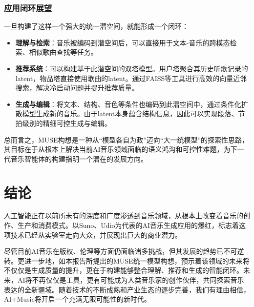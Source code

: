 \documentclass[12pt]{article}
\begin{document}
\subsubsection{应用闭环展望}
一旦构建了这样一个强大的统一潜空间，就能形成一个闭环：
\begin{itemize}
    \item \textbf{理解与检索}：音乐被编码到潜空间后，可以直接用于文本-音乐的跨模态检索、相似歌曲查找等任务。
    \item \textbf{推荐系统}：可以构建基于此潜空间的双塔模型。用户塔聚合其历史听歌记录的latent，物品塔直接使用歌曲的latent。通过FAISS等工具进行高效的向量近邻搜索，解决冷启动问题并提升推荐质量。
    \item \textbf{生成与编辑}：将文本、结构、音色等条件也编码到此潜空间中，通过条件化扩散模型生成新的音乐。由于latent本身蕴含结构信息，因此可以实现段落、节拍级别的精细可控生成与编辑。
\end{itemize}
总而言之，MUSE构想是一种从“模型各自为政”迈向“大一统模型”的探索性思路，其目标在于从根本上解决当前AI音乐领域面临的语义鸿沟和可控性难题，为下一代音乐智能体的构建指明一个潜在的发展方向。

\section{结论}

人工智能正在以前所未有的深度和广度渗透到音乐领域，从根本上改变着音乐的创作、生产和消费模式。以Suno、Udio为代表的AI音乐生成应用的爆红，标志着这项技术已经从实验室走向大众，并展现出巨大的商业潜力。

尽管目前AI音乐在版权、伦理等方面仍面临诸多挑战，但其发展的趋势已不可逆转。更进一步地，如本报告所提出的MUSE统一模型构想，预示着该领域的未来将不仅仅是生成质量的提升，更在于构建能够整合理解、推荐和生成的智能闭环。未来，AI将不再仅仅是工具，更有可能成为人类音乐家的创作伙伴，共同探索音乐表达的全新疆域。随着技术的不断成熟和产业生态的逐步完善，我们有理由相信，AI+Music将开启一个充满无限可能性的新时代。

\end{document}

